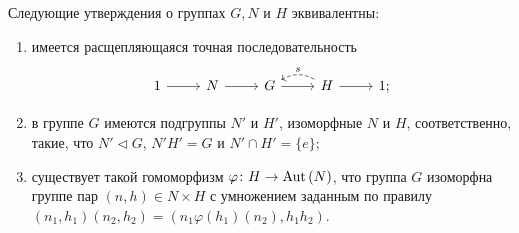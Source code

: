 
\begin{theorem} \label{semidirect product}
	Следующие утверждения о группах $ G, N $ и $ H $ эквивалентны:
	\begin{enumerate}
		\item имеется расщепляющаяся точная последовательность
		$$ \begin{tikzcd}
		1 \ar{r}{} & N \ar{r} & G \ar{r} & H \ar{r} \ar[dashed, bend right=30]{l}[above]{s} & 1;
		\end{tikzcd} $$
		
		\item в группе $ G $ имеются подгруппы $ N' $ и $ H' $, изоморфные $ N $ и $ H $, соответственно, 
		такие, что $ N' \lhd G $, $ N'H' = G $ и $ N' \cap H' = \{e\} $;
		
		\item существует такой гомоморфизм $ \varphi \colon H \to \mathrm{Aut}\left(N\right) $,
		что группа $ G $ изоморфна группе пар $ (n, h) \in N \times H $ с умножением заданным по правилу
		$ (n_1, h_1)(n_2, h_2) = (n_1 \varphi(h_1)(n_2), h_1h_2) $. 
	\end{enumerate}
\end{theorem}

